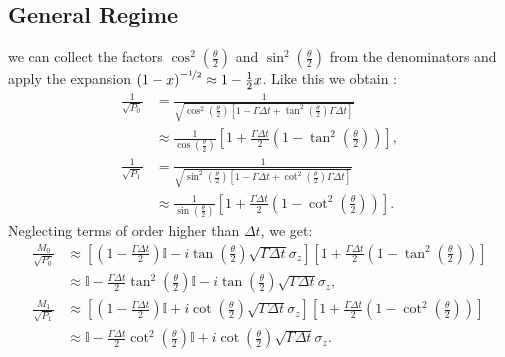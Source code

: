 \documentclass[a4paper,12pt]{article}
\begin{document}
\subsection{General Regime}
we can collect the factors $ \cos^{2} \left(\frac{\theta}{2}\right) $ and $ \sin^{2} \left(\frac{\theta}{2}\right) $ from the denominators and apply the expansion $ \left(1 - x\right)^{-\nicefrac{1}{2}} \approx 1 - \frac{1}{2}x $. Like this we obtain : 
\begin{align}
	\frac{1}{\sqrt{P_{0}}} &= \frac{1}{\sqrt{\cos^{2}\left(\frac{\theta}{2}\right) \left[ 1 - \Gamma\Delta t + \tan^{2}\left(\frac{\theta}{2}\right)\Gamma\Delta t \right]}} \nonumber \\
	&\approx \frac{1}{\cos\left(\frac{\theta}{2}\right)} \left[ 1 + \frac{\Gamma\Delta t}{2} \left( 1 - \tan^{2}\left(\frac{\theta}{2}\right) \right) \right], 
	\label{eq:expansion_P0} \\
	\frac{1}{\sqrt{P_{1}}} &= \frac{1}{\sqrt{\sin^{2}\left(\frac{\theta}{2}\right) \left[ 1 - \Gamma\Delta t + \cot^{2}\left(\frac{\theta}{2}\right)\Gamma\Delta t \right]}} \nonumber \\
	&\approx \frac{1}{\sin\left(\frac{\theta}{2}\right)} \left[ 1 + \frac{\Gamma\Delta t}{2} \left( 1 - \cot^{2}\left(\frac{\theta}{2}\right) \right) \right].
	\label{eq:expansion_P1}
\end{align}
Neglecting terms of order higher than $\Delta t$, we get:
\begin{align}
	\frac{M_{0}}{\sqrt{P_{0}}} &\approx \left[ \left(1 - \frac{\Gamma \Delta t}{2}\right) \mathbb{I} - i \tan\left(\frac{\theta}{2}\right) \sqrt{\Gamma \Delta t} \sigma_{z} \right] \left[ 1 + \frac{\Gamma\Delta t}{2} \left( 1 - \tan^{2}\left(\frac{\theta}{2}\right) \right) \right] \nonumber \\
	&\approx \mathbb{I} - \frac{\Gamma\Delta t}{2} \tan^{2}\left(\frac{\theta}{2}\right) \mathbb{I} - i \tan\left(\frac{\theta}{2}\right) \sqrt{\Gamma \Delta t} \sigma_{z}, \label{eq:norm_M0} \\
	\frac{M_{1}}{\sqrt{P_{1}}} &\approx \left[ \left(1 - \frac{\Gamma \Delta t}{2}\right) \mathbb{I} + i \cot\left(\frac{\theta}{2}\right) \sqrt{\Gamma \Delta t} \sigma_{z} \right] \left[ 1 + \frac{\Gamma\Delta t}{2} \left( 1 - \cot^{2}\left(\frac{\theta}{2}\right) \right) \right] \nonumber \\
	&\approx \mathbb{I} - \frac{\Gamma\Delta t}{2} \cot^{2}\left(\frac{\theta}{2}\right) \mathbb{I} + i \cot\left(\frac{\theta}{2}\right) \sqrt{\Gamma \Delta t} \sigma_{z}. \label{eq:norm_M1}
\end{align}
\end{document}
